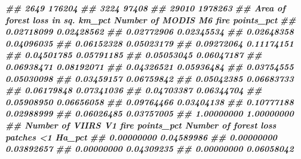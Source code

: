 \documentclass[10pt,landscape,a3paper]{article}
\newenvironment{Shaded}{\begin{snugshade}}{\end{snugshade}}
\newcommand{\DocumentationTok}[1]{\textcolor[rgb]{0.56,0.35,0.01}{\textbf{\textit{#1}}}}
\begin{document}
\begin{Shaded}
\begin{Highlighting}[]
\DocumentationTok{\#\#                            2649                              176204}
\DocumentationTok{\#\#                            3224                               97408}
\DocumentationTok{\#\#                           29010                             1978263}
\DocumentationTok{\#\#  Area of forest loss in sq. km\_pct Number of MODIS M6 fire points\_pct}
\DocumentationTok{\#\#                         0.02718099                         0.02428562}
\DocumentationTok{\#\#                         0.02772906                         0.02345534}
\DocumentationTok{\#\#                         0.02648358                         0.04096035}
\DocumentationTok{\#\#                         0.06152328                         0.05023179}
\DocumentationTok{\#\#                         0.09272064                         0.11174151}
\DocumentationTok{\#\#                         0.04501785                         0.05791185}
\DocumentationTok{\#\#                         0.05053045                         0.06047187}
\DocumentationTok{\#\#                         0.06938471                         0.08192071}
\DocumentationTok{\#\#                         0.04326521                         0.05936484}
\DocumentationTok{\#\#                         0.03754555                         0.05030098}
\DocumentationTok{\#\#                         0.03459157                         0.06759842}
\DocumentationTok{\#\#                         0.05042385                         0.06683733}
\DocumentationTok{\#\#                         0.06179848                         0.07341036}
\DocumentationTok{\#\#                         0.04703387                         0.06344704}
\DocumentationTok{\#\#                         0.05908950                         0.06656058}
\DocumentationTok{\#\#                         0.09764466                         0.03404138}
\DocumentationTok{\#\#                         0.10777188                         0.02988999}
\DocumentationTok{\#\#                         0.06026485                         0.03757005}
\DocumentationTok{\#\#                         1.00000000                         1.00000000}
\DocumentationTok{\#\#  Number of VIIRS V1 fire points\_pct Number of forest loss patches \textless{}1 Ha\_pct}
\DocumentationTok{\#\#                          0.00000000                              0.04589986}
\DocumentationTok{\#\#                          0.00000000                              0.03892657}
\DocumentationTok{\#\#                          0.00000000                              0.04309235}
\DocumentationTok{\#\#                          0.00000000                              0.06058042}

\end{Highlighting}
\end{Shaded}
\end{document}
